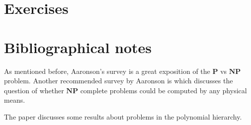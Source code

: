 \section{Exercises}\label{Exercises}

\section{Bibliographical notes}\label{Bibliographical-notes}

As mentioned before, Aaronson's survey \cite{aaronson2016p} is a great
exposition of the \(\mathbf{P}\) vs \(\mathbf{NP}\) problem. Another
recommended survey by Aaronson is \cite{aaronson2005physicalreality}
which discusses the question of whether \(\mathbf{NP}\) complete
problems could be computed by any physical means.

The paper \cite{buchfuhrer2011complexity} discusses some results about
problems in the polynomial hierarchy.

